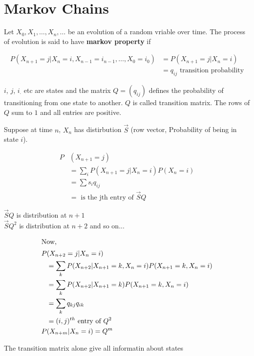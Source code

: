 \section{Markov Chains}
\parindent=0pt
\begin{slide}

\noindent{}Let $X_0, X_1, \ldots, X_n, \ldots $ be an evolution of a random vriable over time.
The process of evolution is said to have \textbf{markov property} if
\begin{shaded}
\begin{align*}
P(X_{n+1} =j|X_n=i,X_{n-1} = i_{n-1},\ldots, X_0 = i_0)
&= P(X_{n+1} = j| X_n=i) 
\\
&=q_{ij} \text{ transition probability}
\end{align*}
\end{shaded}

$i$, $j$, $i_{\cdot}$ etc are states and the matrix $Q = (q_{ij})$ defines the probability of transitioning from one state to another. $Q$ is called transition matrix. The rows of $Q$ sum to $1$ and all entries are positive.
\end{slide}
\begin{slidemaximus}
\begin{multicols}{2}
Suppose at time $n$,  $X_n$ has distirbution $\vec{S}$ (row vector, Probability of being in state $i$). 

\begin{align*}
P&(X_{n+1} = j) 
\\
&= \sum _{i} P(X_{n+1} = j| X_n=i)P(X_n = i)
\\
&= \sum s_iq_{ij} 
\\
&=\text{ is the jth entry of }\vec{S}Q
\end{align*}

$\vec{S}Q$ is distribution at $n+1$\\
$\vec{S}Q^2$ is distribution at $n+2$ and so on...

\begin{align*}
\intertext{Now,} 
P&(X_{n+2}=j|X_n=i) 
\\
&= \sum_k P(X_{n+2}|X_{n+1}=k,X_n=i)P(X_{n+1}=k,X_n=i)
\\
&= \sum_k P(X_{n+2}|X_{n+1}=k)P(X_{n+1}=k,X_n=i)
\\
&= \sum_k q_{kj}q_{ik}
\\
&= (i,j)^{th} \text{ entry of } Q^2
\\
P&(X_{n+m}|X_n=i) = Q^m
\end{align*}
\end{multicols}
\centering
The transition matrix alone give all informatin about states
\end{slidemaximus}

